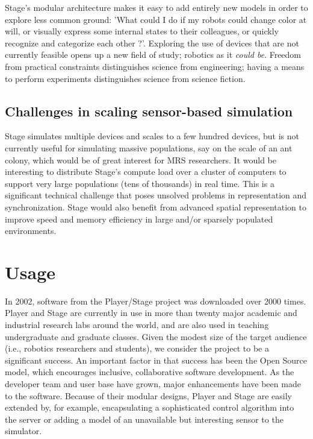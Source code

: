 \documentclass[a4paper]{ICAR2003}
\begin{document}
Stage's modular architecture makes it easy to add entirely new models
in order to explore less common ground: 'What could I do if my robots
could change color at will, or visually express some internal states
to their colleagues, or quickly recognize and categorize each
other \cite{VaughanStoySukhatmeMataric00a}?'.  Exploring the use of devices
that are not currently feasible opens up a new field of study; robotics as
it {\it could be}. Freedom from practical constraints distinguishes science
from engineering; having a means to perform experiments distinguishes science
from science fiction.

\subsection{Challenges in scaling sensor-based simulation}
Stage simulates multiple devices and scales to a few hundred devices,
but is not currently useful for simulating massive populations, say on
the scale of an ant colony, which would be of great interest for MRS
researchers. It would be interesting to distribute Stage's compute
load over a cluster of computers to support very large populations
(tens of thousands) in real time. This is a significant technical
challenge that poses unsolved problems in representation and
synchronization. Stage would also benefit from advanced spatial
representation to improve speed and memory efficiency in large and/or
sparsely populated environments.

\section{Usage}
\label{sect:usage}
In 2002, software from the Player/Stage project was downloaded over 2000
times.  Player and Stage are currently in use in more than twenty major
academic and industrial research labs around the world, and are also used in
teaching undergraduate and graduate classes.  Given the modest size of the
target audience (i.e., robotics researchers and students), we consider the
project to be a significant success.  An important factor in that success
has been the Open Source model, which encourages inclusive, collaborative
software development.  As the developer team and user base have grown,
major enhancements have been made to the software.  Because of their modular
designs, Player and Stage are easily extended by, for example, encapsulating
a sophisticated control algorithm into the server or adding a model of an
unavailable but interesting sensor to the simulator.
\end{document}
